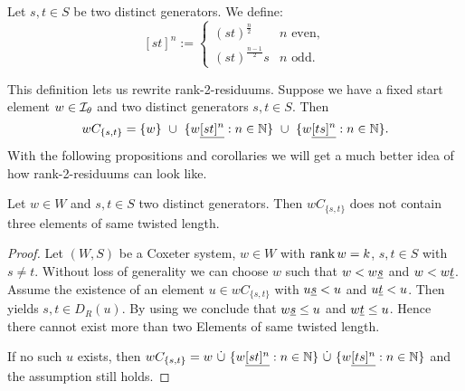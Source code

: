 \begin{defi}
	Let $s,t \in S$ be two distinct generators. We define:
	$$[st]^n :=
	\begin{cases}
	(st)^{\frac{n}{2}} & n \textrm{ even}, \\
	(st)^{\frac{n-1}{2}}s & n \textrm{ odd}. 
	\end{cases}$$
\end{defi}

This definition lets us rewrite rank-2-residuums. Suppose we have a fixed start element $w \in \mathcal{I}_{\theta}$ and two distinct generators $s,t \in S$. Then
$$ wC_{\{s,t\}} = \{ w \} \ \cup \ \{ w \underline{[st]^n} : n \in \mathbb{N} \} \ \cup \ \{ w \underline{[ts]^n} : n \in \mathbb{N} \}. $$
With the following propositions and corollaries we will get a much better idea of how rank-2-residuums can look like.

\begin{prop}
	Let $w \in W$ and $s,t \in S$ two distinct generators. Then $wC_{\{s,t\}}$ does not contain three elements of same twisted length.

	\begin{proof}
		Let $(W,S)$ be a Coxeter system, $w \in W$ with $\operatorname{rank} w = k$, $s, t \in S$ with $s \neq t$. Without loss of generality we can choose $w$ such that $w < w \underline{s}$ and $w < w \underline{t}$. Assume the existence of an element $u \in wC_{\{s,t\}}$ with $u \underline{s} < u$ and $u \underline{t} < u$. Then \cite[Lemma 3.8]{hultman:comb-twisted-invo} yields $s,t \in D_R(u)$. By using \cite[Lemma 3.9]{hultman:comb-twisted-invo} we conclude that $w \underline{s} \leq u$ and $w \underline{t} \leq u$. Hence there cannot exist more than two Elements of same twisted length.

		If no such $u$ exists, then $wC_{\{s,t\}} = w \ \dot \cup \ \{ w \ul{[st]^n} : n \in \nn \} \ \dot \cup \ \{ w \ul{[ts]^n} : n \in \nn \}$ and the assumption still holds.
	\end{proof}
\end{prop}

